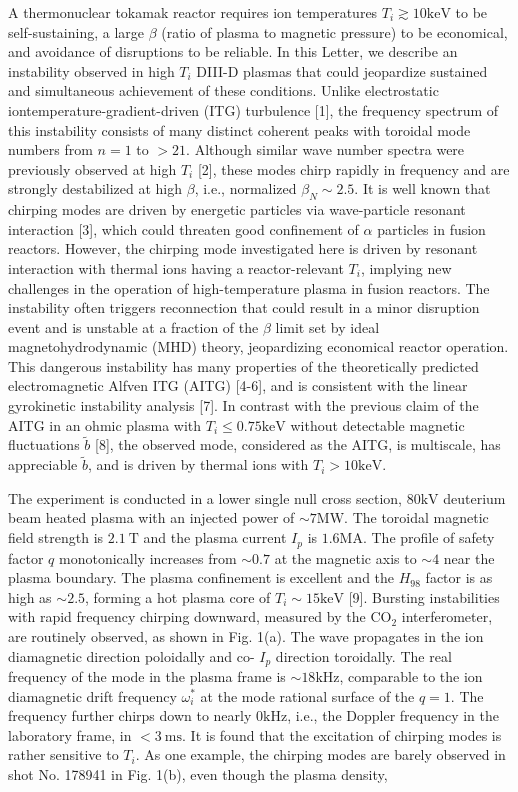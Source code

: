 \documentclass[10pt]{article}
\begin{document}
A thermonuclear tokamak reactor requires ion temperatures $T_{i} \gtrsim 10 \mathrm{keV}$ to be self-sustaining, a large $\beta$ (ratio of plasma to magnetic pressure) to be economical, and avoidance of disruptions to be reliable. In this Letter, we describe an instability observed in high $T_{i}$ DIII-D plasmas that could jeopardize sustained and simultaneous achievement of these conditions. Unlike electrostatic iontemperature-gradient-driven (ITG) turbulence [1], the frequency spectrum of this instability consists of many distinct coherent peaks with toroidal mode numbers from $n=1$ to $>21$. Although similar wave number spectra were previously observed at high $T_{i}$ [2], these modes chirp rapidly in frequency and are strongly destabilized at high $\beta$, i.e., normalized $\beta_{N} \sim 2.5$. It is well known that chirping modes are driven by energetic particles via wave-particle resonant interaction [3], which could threaten good confinement of $\alpha$ particles in fusion reactors. However, the chirping mode investigated here is driven by resonant interaction with thermal ions having a reactor-relevant $T_{i}$, implying new challenges in the operation of high-temperature plasma in fusion reactors. The instability often triggers reconnection that could result in a minor disruption event and is unstable at a fraction of the $\beta$ limit set by ideal magnetohydrodynamic (MHD) theory, jeopardizing economical reactor operation. This dangerous instability has many properties of the theoretically predicted electromagnetic Alfven ITG (AITG) [4-6], and is consistent with the linear gyrokinetic instability analysis [7]. In contrast with the previous claim of the AITG in an ohmic plasma with $T_{i} \leq 0.75 \mathrm{keV}$ without detectable magnetic fluctuations $\tilde{b}$ [8], the observed mode, considered as the AITG, is multiscale, has appreciable $\tilde{b}$, and is driven by thermal ions with $T_{i}>10 \mathrm{keV}$.

The experiment is conducted in a lower single null cross section, $80 \mathrm{kV}$ deuterium beam heated plasma with an injected power of $\sim 7 \mathrm{MW}$. The toroidal magnetic field strength is $2.1 \mathrm{~T}$ and the plasma current $I_{p}$ is $1.6 \mathrm{MA}$. The profile of safety factor $q$ monotonically increases from $\sim 0.7$ at the magnetic axis to $\sim 4$ near the plasma boundary. The plasma confinement is excellent and the $H_{98}$ factor is as high as $\sim 2.5$, forming a hot plasma core of $T_{i} \sim 15 \mathrm{keV}$ [9]. Bursting instabilities with rapid frequency chirping downward, measured by the $\mathrm{CO}_{2}$ interferometer, are routinely observed, as shown in Fig. 1(a). The wave propagates in the ion diamagnetic direction poloidally and co- $I_{p}$ direction toroidally. The real frequency of the mode in the plasma frame is $\sim 18 \mathrm{kHz}$, comparable to the ion diamagnetic drift frequency $\omega_{i}^{*}$ at the mode rational surface of the $q=1$. The frequency further chirps down to nearly $0 \mathrm{kHz}$, i.e., the Doppler frequency in the laboratory frame, in $<3 \mathrm{~ms}$. It is found that the excitation of chirping modes is rather sensitive to $T_{i}$. As one example, the chirping modes are barely observed in shot No. 178941 in Fig. 1(b), even though the plasma density,
\end{document}
